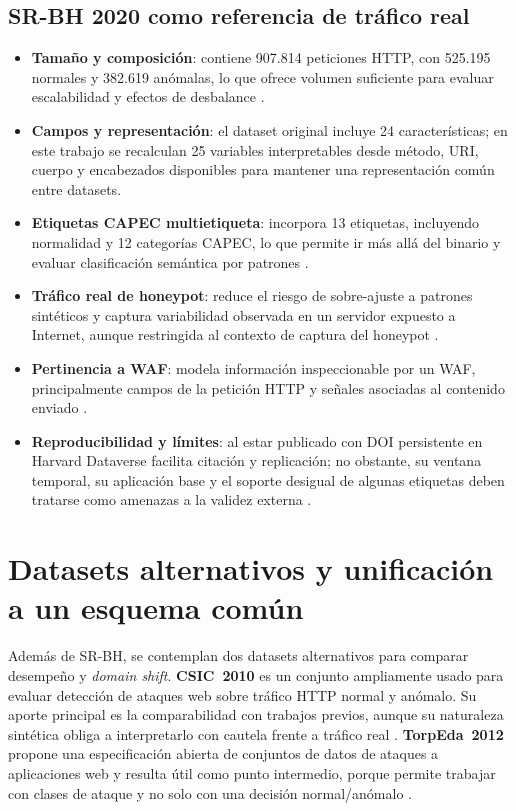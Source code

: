 \documentclass[12pt,oneside]{report}
\begin{document}
\subsection{SR-BH 2020 como referencia de tráfico real}
\begin{itemize}[leftmargin=*]
  \item \textbf{Tamaño y composición}: contiene 907.814 peticiones HTTP, con 525.195 normales y 382.619 anómalas, lo que ofrece volumen suficiente para evaluar escalabilidad y efectos de desbalance \cite{srbh_paper}.
  \item \textbf{Campos y representación}: el dataset original incluye 24 características; en este trabajo se recalculan 25 variables interpretables desde método, URI, cuerpo y encabezados disponibles para mantener una representación común entre datasets.
  \item \textbf{Etiquetas CAPEC multietiqueta}: incorpora 13 etiquetas, incluyendo normalidad y 12 categorías CAPEC, lo que permite ir más allá del binario y evaluar clasificación semántica por patrones \cite{srbh_paper,capec_about}.
  \item \textbf{Tráfico real de honeypot}: reduce el riesgo de sobre-ajuste a patrones sintéticos y captura variabilidad observada en un servidor expuesto a Internet, aunque restringida al contexto de captura del honeypot \cite{srbh_paper}.
  \item \textbf{Pertinencia a WAF}: modela información inspeccionable por un WAF, principalmente campos de la petición HTTP y señales asociadas al contenido enviado \cite{owasp_waf,modsecurity_site}.
  \item \textbf{Reproducibilidad y límites}: al estar publicado con DOI persistente en Harvard Dataverse facilita citación y replicación; no obstante, su ventana temporal, su aplicación base y el soporte desigual de algunas etiquetas deben tratarse como amenazas a la validez externa \cite{srbh_dataverse,srbh_paper}.
\end{itemize}

\section{Datasets alternativos y unificación a un esquema común}
Además de SR-BH, se contemplan dos datasets alternativos para comparar desempeño y \textit{domain shift}. \textbf{CSIC~2010} es un conjunto ampliamente usado para evaluar detección de ataques web sobre tráfico HTTP normal y anómalo. Su aporte principal es la comparabilidad con trabajos previos, aunque su naturaleza sintética obliga a interpretarlo con cautela frente a tráfico real \cite{csic2010_impact,csic2010_doc}. \textbf{TorpEda~2012} propone una especificación abierta de conjuntos de datos de ataques a aplicaciones web y resulta útil como punto intermedio, porque permite trabajar con clases de ataque y no solo con una decisión normal/anómalo \cite{torpeda_2012}.
\end{document}
